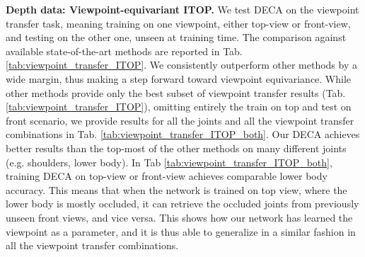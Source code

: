 \documentclass[10pt,twocolumn,letterpaper]{article}
\begin{document}
\textbf{Depth data: Viewpoint-equivariant ITOP.} We test DECA on the viewpoint transfer task, meaning training on one viewpoint, either top-view or front-view, and testing on the other one, unseen at training time. The comparison against available state-of-the-art methods \cite{shotton2011real, yub2015random, carreira2016human, haque2016towards} are reported in Tab. \ref{tab:viewpoint_transfer_ITOP}. We consistently outperform other methods by a wide margin, thus making a step forward toward viewpoint equivariance. 
While other methods provide only the best subset of viewpoint transfer results (Tab. \ref{tab:viewpoint_transfer_ITOP}), omitting entirely the train on top and test on front scenario, we provide results for all the joints and all the viewpoint transfer combinations in Tab. \ref{tab:viewpoint_transfer_ITOP_both}. Our DECA achieves better results than the top-most of the other methods on many different joints (e.g. shoulders, lower body). In Tab \ref{tab:viewpoint_transfer_ITOP_both}, training DECA on top-view or front-view achieves comparable lower body accuracy. This means that when the network is trained on top view, where the lower body is mostly occluded, it can retrieve the occluded joints from previously unseen front views, and vice versa. This shows how our network has learned the viewpoint as a parameter, and it is thus able to generalize in a similar fashion in all the viewpoint transfer combinations. 
\end{document}
